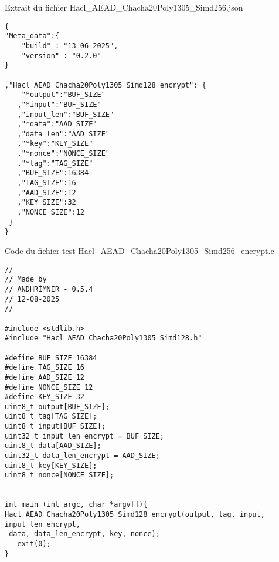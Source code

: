 \vfill
\begin{listing}
  \caption{Extrait du fichier Hacl\_AEAD\_Chacha20Poly1305\_Simd256.json}
  \label{lst:exemple_json}
  \begin{verbatim}
{
"Meta_data":{
    "build" : "13-06-2025",
    "version" : "0.2.0"
}

,"Hacl_AEAD_Chacha20Poly1305_Simd128_encrypt": {
    "*output":"BUF_SIZE"
   ,"*input":"BUF_SIZE"
   ,"input_len":"BUF_SIZE"
   ,"*data":"AAD_SIZE"
   ,"data_len":"AAD_SIZE"
   ,"*key":"KEY_SIZE"
   ,"*nonce":"NONCE_SIZE"
   ,"*tag":"TAG_SIZE"
   ,"BUF_SIZE":16384
   ,"TAG_SIZE":16
   ,"AAD_SIZE":12
   ,"KEY_SIZE":32
   ,"NONCE_SIZE":12
 }
}
  \end{verbatim}
\end{listing}
\vfill
\begin{listing}
  \caption{Code du fichier test Hacl\_AEAD\_Chacha20Poly1305\_Simd256\_encrypt.c}
  \label{lst:exemple_complet}
  \begin{verbatim}
//
// Made by
// ANDHRÍMNIR - 0.5.4
// 12-08-2025
//

#include <stdlib.h>
#include "Hacl_AEAD_Chacha20Poly1305_Simd128.h"

#define BUF_SIZE 16384
#define TAG_SIZE 16
#define AAD_SIZE 12
#define NONCE_SIZE 12
#define KEY_SIZE 32
uint8_t output[BUF_SIZE];
uint8_t tag[TAG_SIZE];
uint8_t input[BUF_SIZE];
uint32_t input_len_encrypt = BUF_SIZE;
uint8_t data[AAD_SIZE];
uint32_t data_len_encrypt = AAD_SIZE;
uint8_t key[KEY_SIZE];
uint8_t nonce[NONCE_SIZE];


int main (int argc, char *argv[]){
Hacl_AEAD_Chacha20Poly1305_Simd128_encrypt(output, tag, input, input_len_encrypt,
 data, data_len_encrypt, key, nonce);
   exit(0);
}
  \end{verbatim}
\end{listing}

\vfill